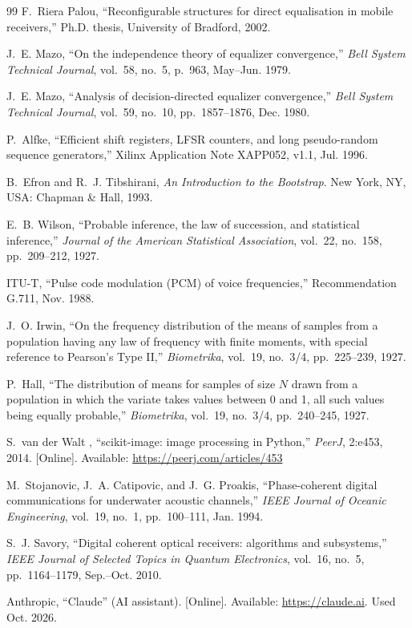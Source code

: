 {\begin{thebibliography}{99}
 F.~Riera Palou, ``Reconfigurable structures for direct equalisation in mobile receivers,'' Ph.D. thesis, University of Bradford, 2002.

 J.~E. Mazo, ``On the independence theory of equalizer convergence,'' \emph{Bell System Technical Journal}, vol.~58, no.~5, p.~963, May--Jun. 1979.

 J.~E. Mazo, ``Analysis of decision-directed equalizer convergence,'' \emph{Bell System Technical Journal}, vol.~59, no.~10, pp.~1857--1876, Dec. 1980.

 P.~Alfke, ``Efficient shift registers, LFSR counters, and long pseudo-random sequence generators,'' Xilinx Application Note XAPP052, v1.1, Jul. 1996.

 B.~Efron and R.~J. Tibshirani, \emph{An Introduction to the Bootstrap}. New York, NY, USA: Chapman \& Hall, 1993.

 E.~B. Wilson, ``Probable inference, the law of succession, and statistical inference,'' \emph{Journal of the American Statistical Association}, vol.~22, no.~158, pp.~209--212, 1927.

 ITU-T, ``Pulse code modulation (PCM) of voice frequencies,'' Recommendation G.711, Nov. 1988.

 J.~O. Irwin, ``On the frequency distribution of the means of samples from a population having any law of frequency with finite moments, with special reference to Pearson's Type II,'' \emph{Biometrika}, vol.~19, no.~3/4, pp.~225--239, 1927.

 P.~Hall, ``The distribution of means for samples of size $N$ drawn from a population in which the variate takes values between 0 and 1, all such values being equally probable,'' \emph{Biometrika}, vol.~19, no.~3/4, pp.~240--245, 1927.

 S.~van der Walt \etal, ``scikit-image: image processing in Python,'' \emph{PeerJ}, 2:e453, 2014. [Online]. Available: \url{https://peerj.com/articles/453}

 M.~Stojanovic, J.~A. Catipovic, and J.~G. Proakis, ``Phase-coherent digital communications for underwater acoustic channels,'' \emph{IEEE Journal of Oceanic Engineering}, vol.~19, no.~1, pp.~100--111, Jan. 1994.

 S.~J. Savory, ``Digital coherent optical receivers: algorithms and subsystems,'' \emph{IEEE Journal of Selected Topics in Quantum Electronics}, vol.~16, no.~5, pp.~1164--1179, Sep.--Oct. 2010.

 Anthropic, ``Claude'' (AI assistant). [Online]. Available: \url{https://claude.ai}. Used Oct. 2026.

\end{thebibliography}
}
